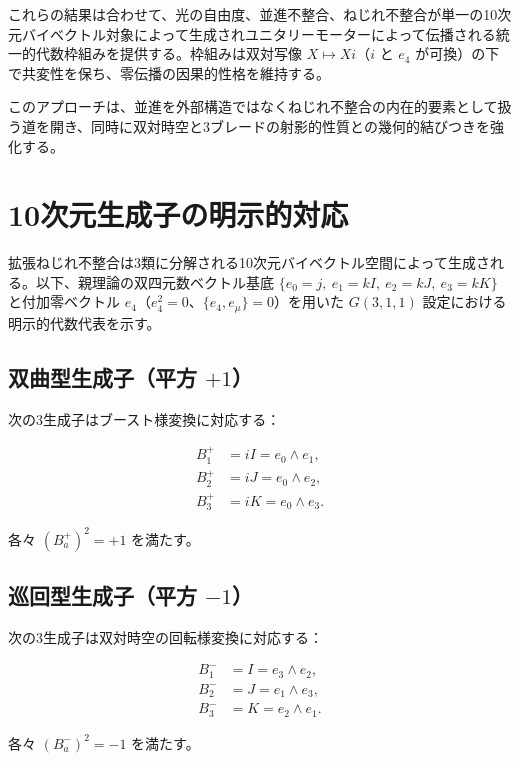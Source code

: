 \documentclass[11pt,a4paper]{article}
\begin{document}
これらの結果は合わせて、光の自由度、並進不整合、ねじれ不整合が単一の10次元バイベクトル対象によって生成されユニタリーモーターによって伝播される統一的代数枠組みを提供する。枠組みは双対写像 $X\mapsto Xi$（$i$ と $e_{4}$ が可換）の下で共変性を保ち、零伝播の因果的性格を維持する。

このアプローチは、並進を外部構造ではなくねじれ不整合の内在的要素として扱う道を開き、同時に双対時空と3ブレードの射影的性質との幾何的結びつきを強化する。

\appendix

\section{10次元生成子の明示的対応}

拡張ねじれ不整合は3類に分解される10次元バイベクトル空間によって生成される。以下、親理論の双四元数ベクトル基底 $\{e_{0}=j,\ e_{1}=kI,\ e_{2}=kJ,\ e_{3}=kK\}$ と付加零ベクトル $e_{4}$（$e_{4}^{2}=0$、$\{e_{4},e_{\mu}\}=0$）を用いた $G(3,1,1)$ 設定における明示的代数代表を示す。

\subsection{双曲型生成子（平方 $+1$）}

次の3生成子はブースト様変換に対応する：

\begin{align*}
B_{1}^{+} &= iI = e_{0}\wedge e_{1}, \\
B_{2}^{+} &= iJ = e_{0}\wedge e_{2}, \\
B_{3}^{+} &= iK = e_{0}\wedge e_{3}.
\end{align*}

各々 $(B_{a}^{+})^{2} = +1$ を満たす。

\subsection{巡回型生成子（平方 $-1$）}

次の3生成子は双対時空の回転様変換に対応する：

\begin{align*}
B_{1}^{-} &= I = e_{3}\wedge e_{2}, \\
B_{2}^{-} &= J = e_{1}\wedge e_{3}, \\
B_{3}^{-} &= K = e_{2}\wedge e_{1}.
\end{align*}

各々 $(B_{a}^{-})^{2} = -1$ を満たす。
\end{document}

